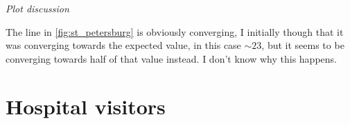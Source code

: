 \documentclass[11pt, a4papaer]{article}
\begin{document}
\textit{Plot discussion}

\vspace{2mm}\noindent
The line in \ref{fig:st_petersburg} is obviously converging, I initially though that it was converging towards the expected value, in this case $\sim 23$,
but it seems to be converging towards half of that value instead. I don't know why this happens.

\section{Hospital visitors}
\end{document}
